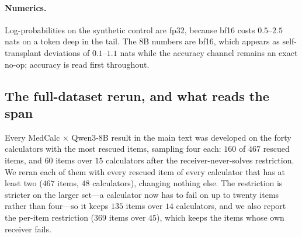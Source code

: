 \documentclass{article}
\begin{document}
\paragraph{Numerics.} Log-probabilities on the synthetic control are fp32,
because bf16 costs $0.5$--$2.5$ nats on a token deep in the tail. The 8B numbers
are bf16, which appears as self-transplant deviations of $0.1$--$1.1$ nats while
the accuracy channel remains an exact no-op; accuracy is read first throughout.




\subsection{The full-dataset rerun, and what reads the span}
\label{app:fullscale}

Every MedCalc $\times$ Qwen3-8B result in the main text was developed on the
forty calculators with the most rescued items, sampling four each: $160$ of
$467$ rescued items, and $60$ items over $15$ calculators after the
receiver-never-solves restriction. We reran each of them with every rescued
item of every calculator that has at least two ($467$ items, $48$ calculators),
changing nothing else. The restriction is stricter on the larger set---a
calculator now has to fail on up to twenty items rather than four---so it keeps
$135$ items over $14$ calculators, and we also report the per-item restriction
($369$ items over $45$), which keeps the items whose own receiver fails.
\end{document}
